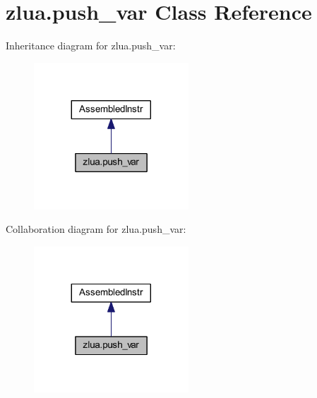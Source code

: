 \hypertarget{classzlua_1_1push__var}{}\section{zlua.\+push\+\_\+var Class Reference}
\label{classzlua_1_1push__var}


Inheritance diagram for zlua.\+push\+\_\+var\+:
\nopagebreak
\begin{figure}[H]
\begin{center}
\leavevmode
\includegraphics[width=164pt]{classzlua_1_1push__var__inherit__graph}
\end{center}
\end{figure}


Collaboration diagram for zlua.\+push\+\_\+var\+:
\nopagebreak
\begin{figure}[H]
\begin{center}
\leavevmode
\includegraphics[width=164pt]{classzlua_1_1push__var__coll__graph}
\end{center}
\end{figure}

